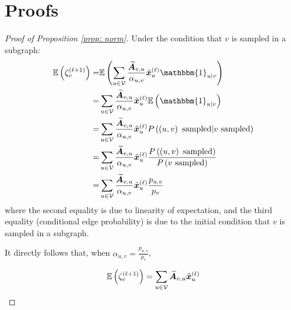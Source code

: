 \appendix
\section{Proofs\label{appendix: proof}}

\begin{proof}[Proof of Proposition \ref{prop: norm}]
Under the condition that $v$ is sampled in a subgraph:
\begin{align}
\mathbb{E}\paren{\zeta_v^{\paren{\ell+1}}}=&\mathbb{E}\paren{\sum_{u\in\V}\frac{\Anorm_{v,u}}{\alpha_{u,v}}\Tilde{\bm{x}}_u^{\paren{\ell}}\mathbbm{1}_{u|v}}\nonumber\\
    =& \sum_{u\in\V}\frac{\Anorm_{v,u}}{\alpha_{u,v}}\Tilde{\bm{x}}_u^{\paren{\ell}}\mathbb{E}\paren{\mathbbm{1}_{u|v}}\nonumber\\
    =& \sum_{u\in\V}\frac{\Anorm_{v,u}}{\alpha_{u,v}}\Tilde{\bm{x}}_u^{\paren{\ell}}P\paren{\paren{u,v}\text{ sampled}|v\text{ sampled}}\nonumber\\
    =& \sum_{u\in\V}\frac{\Anorm_{v,u}}{\alpha_{u,v}}\Tilde{\bm{x}}_u^{\paren{\ell}}\frac{P\paren{\paren{u,v}\text{ sampled}}}{P\paren{v\text{ sampled}}}\nonumber\\
    =& \sum_{u\in\V}\frac{\Anorm_{v,u}}{\alpha_{u,v}}\Tilde{\bm{x}}_u^{\paren{\ell}}\frac{p_{u,v}}{p_v}
\end{align}
where the second equality is due to linearity of expectation, and the third equality (conditional edge probability) is due to the initial condition that $v$ is sampled in a subgraph.

It directly follows that, when $\alpha_{u,v}=\frac{p_{u,v}}{p_v}$,

\begin{align}
    \mathbb{E}\paren{\zeta_v^{\paren{\ell+1}}}=\sum_{u\in\V}\Anorm_{v,u}\Tilde{\bm{x}}_u^{\paren{\ell}}\nonumber
\end{align}
\end{proof}

